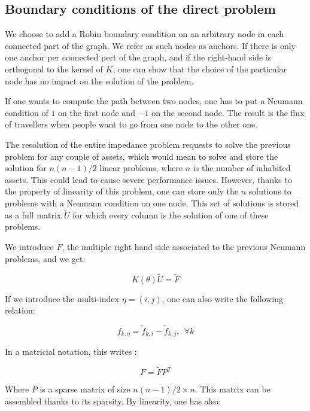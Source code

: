 \documentclass[11pt,a4paper]{article}  %
\begin{document}
\subsection{Boundary conditions of the direct problem}

We choose to add a Robin boundary condition on an arbitrary node in each connected part of the graph. We refer as such nodes as anchors. If there is only one anchor per connected pert of the graph, and if the right-hand side is orthogonal to the kernel of $K$, one can show that the choice of the particular node has no impact on the solution of the problem.

If one wants to compute the path between two nodes, one has to put a Neumann condition of $1$ on the first node and $-1$ on the second node. The result is the flux of travellers when people want to go from one node to the other one.

The resolution of the entire impedance problem requests to solve the previous problem for any couple of assets, which would mean to solve and store the solution for $n(n-1)/2$ linear problems, where $n$ is the number of inhabited assets. This could lead to cause severe performance issues. However, thanks to the property of linearity of this problem, one can store only the $n$ solutions to problems with a Neumann condition on one node. This set of solutions is stored as a full matrix $\tilde{U}$ for which every column is the solution of one of these problems.

We introduce $\tilde{F}$, the multiple right hand side associated to the previous Neumann problems, and we get:

\begin{equation}
K(\theta)\tilde{U} = \tilde{F}
\end{equation}

If we introduce the multi-index $\eta = (i,j)$, one can also write the following relation:

\begin{equation}
f_{k,\eta} = \tilde{f}_{k,i} - \tilde{f}_{k,j},\ \ \forall k
\end{equation}

In a matricial notation, this writes :

\begin{equation}
F = \tilde{F} P^T
\end{equation}

Where $P$ is a sparse matrix of size $n(n-1)/2\times n$. This matrix can be assembled thanks to its sparsity. By linearity, one has also:
\end{document}

